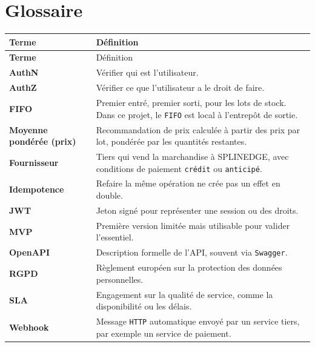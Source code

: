 \documentclass[11pt,a4paper]{scrreprt}
\newcommand{\code}[1]{\texttt{#1}}
\begin{document}
\chapter{Glossaire}
\begin{longtable}{>{\bfseries}p{4.2cm}p{9.8cm}}
\toprule
Terme & Définition \\
\midrule
\endfirsthead
\toprule
Terme & Définition \\
\midrule
\endhead
AuthN & Vérifier qui est l'utilisateur. \\
AuthZ & Vérifier ce que l'utilisateur a le droit de faire. \\
FIFO & Premier entré, premier sorti, pour les lots de stock. Dans ce projet, le \code{FIFO} est local à l'entrepôt de sortie. \\
Moyenne pondérée (prix) & Recommandation de prix calculée à partir des prix par lot, pondérée par les quantités restantes. \\
Fournisseur & Tiers qui vend la marchandise à SPLINEDGE, avec conditions de paiement \code{crédit} ou \code{anticipé}. \\
Idempotence & Refaire la même opération ne crée pas un effet en double. \\
JWT & Jeton signé pour représenter une session ou des droits. \\
MVP & Première version limitée mais utilisable pour valider l'essentiel. \\
OpenAPI & Description formelle de l'API, souvent via \code{Swagger}. \\
RGPD & Règlement européen sur la protection des données personnelles. \\
SLA & Engagement sur la qualité de service, comme la disponibilité ou les délais. \\
Webhook & Message \code{HTTP} automatique envoyé par un service tiers, par exemple un service de paiement. \\
\bottomrule
\end{longtable}
\end{document}
